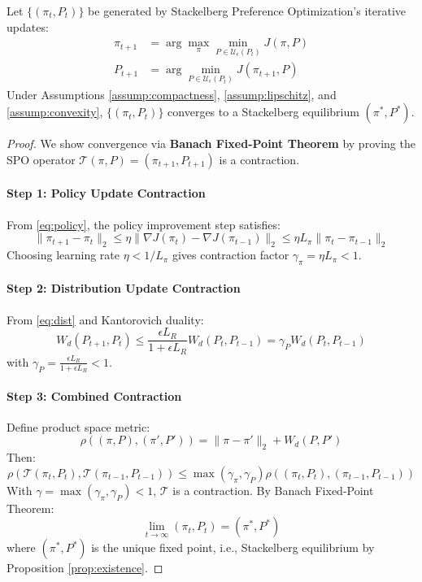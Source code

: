 \begin{theorem}
\label{thm:convergence}
Let \(\{(\pi_t, P_t)\}\) be generated by Stackelberg Preference Optimization's iterative updates:
\begin{align}
    \pi_{t+1} &= \arg\max_{\pi} \min_{P \in \mathcal{U}_\epsilon(P_t)} J(\pi, P) \label{eq:policy} \\
    P_{t+1} &= \arg\min_{P \in \mathcal{U}_\epsilon(P_t)} J(\pi_{t+1}, P) \label{eq:dist}
\end{align}
Under Assumptions \ref{assump:compactness}, \ref{assump:lipschitz}, and \ref{assump:convexity},
\(\{(\pi_t, P_t)\}\) converges to a Stackelberg equilibrium \((\pi^*, P^*)\).
\end{theorem}

\begin{proof}
We show convergence via \textbf{Banach Fixed-Point Theorem} by proving the SPO operator \(\mathcal{T}(\pi, P) = (\pi_{t+1}, P_{t+1})\) is a contraction.

\paragraph{Step 1: Policy Update Contraction}
From \eqref{eq:policy}, the policy improvement step satisfies:
\[
\|\pi_{t+1} - \pi_t\|_2 \leq \eta \|\nabla J(\pi_t) - \nabla J(\pi_{t-1})\|_2 \leq \eta L_\pi \|\pi_t - \pi_{t-1}\|_2
\]
Choosing learning rate \(\eta < 1/L_\pi\) gives contraction factor \(\gamma_\pi = \eta L_\pi < 1\).

\paragraph{Step 2: Distribution Update Contraction}
From \eqref{eq:dist} and Kantorovich duality:
\[
W_d(P_{t+1}, P_t) \leq \frac{\epsilon L_R}{1 + \epsilon L_R} W_d(P_t, P_{t-1}) = \gamma_P W_d(P_t, P_{t-1})
\]
with \(\gamma_P = \frac{\epsilon L_R}{1 + \epsilon L_R} < 1\).

\paragraph{Step 3: Combined Contraction}
Define product space metric:
\[
\rho\left((\pi, P), (\pi', P')\right) = \|\pi - \pi'\|_2 + W_d(P, P')
\]
Then:
\[
\rho(\mathcal{T}(\pi_t, P_t), \mathcal{T}(\pi_{t-1}, P_{t-1})) \leq \max(\gamma_\pi, \gamma_P)\rho\left((\pi_t, P_t), (\pi_{t-1}, P_{t-1})\right)
\]
With \(\gamma = \max(\gamma_\pi, \gamma_P) < 1\), \(\mathcal{T}\) is a contraction. By Banach Fixed-Point Theorem:
\[
\lim_{t\to\infty} (\pi_t, P_t) = (\pi^*, P^*)
\]
where \((\pi^*, P^*)\) is the unique fixed point, i.e., Stackelberg equilibrium by Proposition \ref{prop:existence}.
\end{proof}


